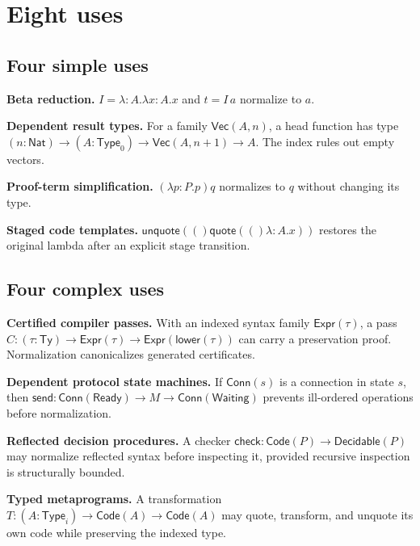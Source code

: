 \documentclass[11pt,a4paper]{article}
\newcommand{\Ty}{\mathsf{Type}}
\renewcommand{\quote}[1]{\mathsf{quote}(#1)}
\newcommand{\unquote}[1]{\mathsf{unquote}(#1)}
\begin{document}
\section{Eight uses}
\subsection{Four simple uses}
\textbf{Beta reduction.} $I=\lambda:A.\lambda x:A.x$ and $t=I\,a$ normalize to $a$.

\textbf{Dependent result types.} For a family $\mathsf{Vec}(A,n)$, a head function has type $(n:\mathsf{Nat})\to(A:\Ty_0)\to\mathsf{Vec}(A,n+1)\to A$. The index rules out empty vectors.

\textbf{Proof-term simplification.} $(\lambda p:P.p)q$ normalizes to $q$ without changing its type.

\textbf{Staged code templates.} $\unquote(\quote(\lambda:A.x))$ restores the original lambda after an explicit stage transition.

\subsection{Four complex uses}
\textbf{Certified compiler passes.} With an indexed syntax family $\mathsf{Expr}(\tau)$, a pass $C:(\tau:\mathsf{Ty})\to\mathsf{Expr}(\tau)\to\mathsf{Expr}(\mathsf{lower}(\tau))$ can carry a preservation proof. Normalization canonicalizes generated certificates.

\textbf{Dependent protocol state machines.} If $\mathsf{Conn}(s)$ is a connection in state $s$, then $\mathsf{send}:\mathsf{Conn}(\mathsf{Ready})\to M\to\mathsf{Conn}(\mathsf{Waiting})$ prevents ill-ordered operations before normalization.

\textbf{Reflected decision procedures.} A checker $\mathsf{check}:\mathsf{Code}(P)\to\mathsf{Decidable}(P)$ may normalize reflected syntax before inspecting it, provided recursive inspection is structurally bounded.

\textbf{Typed metaprograms.} A transformation $T:(A:\Ty_i)\to\mathsf{Code}(A)\to\mathsf{Code}(A)$ may quote, transform, and unquote its own code while preserving the indexed type.
\end{document}

